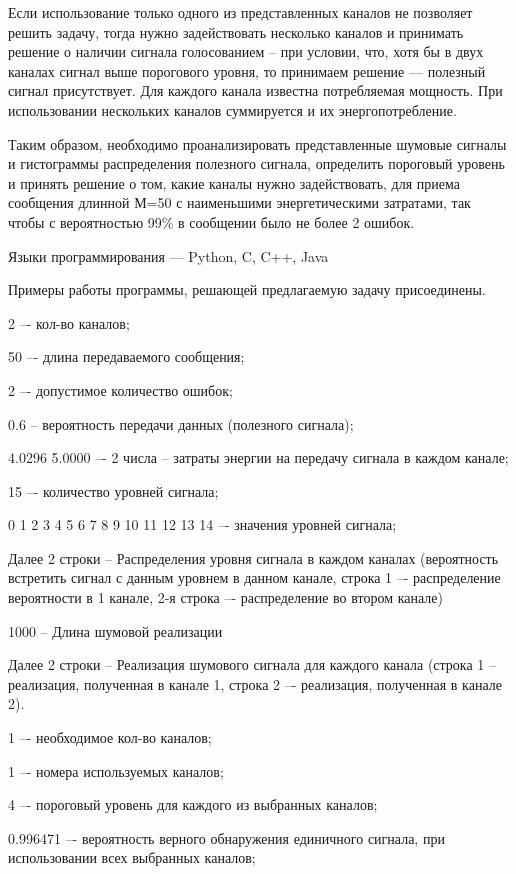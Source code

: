 Если использование только одного из представленных каналов не позволяет решить задачу, тогда нужно задействовать несколько каналов и принимать решение о наличии сигнала голосованием – при условии, что, хотя бы в двух каналах сигнал выше порогового уровня, то принимаем решение — полезный сигнал присутствует. Для каждого канала известна потребляемая мощность. При использовании нескольких каналов суммируется и их энергопотребление.

Таким образом, необходимо проанализировать представленные шумовые сигналы и гистограммы распределения полезного сигнала, определить пороговый уровень и принять решение о том, какие каналы нужно задействовать, для приема сообщения длинной М=50 с наименьшими энергетическими затратами, так чтобы с вероятностью 99\% в сообщении было не более 2 ошибок.

Языки программирования — Python, C, C++, Java

Примеры работы программы, решающей предлагаемую задачу присоединены.


2 –- кол-во каналов;

50 –- длина передаваемого сообщения;

2 –- допустимое количество ошибок;

0.6 -- вероятность передачи данных (полезного сигнала);

4.0296 5.0000 –- 2 числа -- затраты энергии на передачу сигнала в каждом канале;

15 –- количество уровней сигнала;

0 1 2 3 4 5 6 7 8 9 10 11 12 13 14 –- значения уровней сигнала;

Далее 2 строки -- Распределения уровня сигнала в каждом каналах (вероятность встретить сигнал с данным уровнем в данном канале, строка 1 –- распределение вероятности в 1 канале, 2-я строка –- распределение во втором канале)

1000 -- Длина шумовой реализации

Далее 2 строки -- Реализация шумового сигнала для каждого канала (строка 1 -- реализация, полученная в канале 1, строка 2 –- реализация, полученная в канале 2).


\outputfmtSection

1 –- необходимое кол-во каналов;

1 –- номера используемых каналов;

4 –- пороговый уровень для каждого из выбранных каналов;

0.996471 –- вероятность верного обнаружения единичного сигнала, при использовании всех выбранных каналов;

